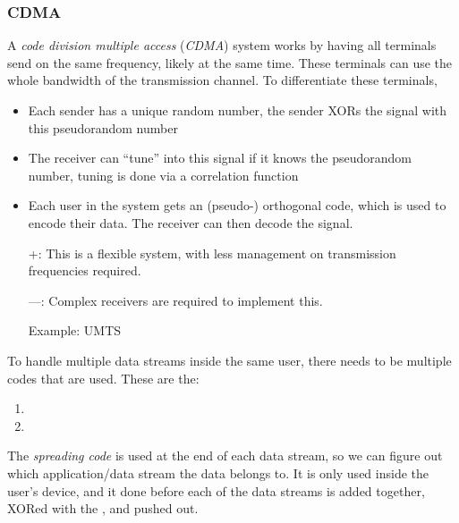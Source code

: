 \subsubsection{CDMA}\label{subsubsec:CDMA}
\begin{definition}\label{def:CDMA}
  A \emph{code division multiple access} (\emph{CDMA}) system works by having all terminals send on the same frequency, likely at the same time.
  These terminals can use the whole bandwidth of the transmission channel.
  To differentiate these terminals,
  \begin{itemize}[noitemsep]
  \item Each sender has a unique random number, the sender XORs the signal with this pseudorandom number
  \item The receiver can ``tune'' into this signal if it knows the pseudorandom number, tuning is done via a correlation function
  \end{itemize}

  \begin{itemize}[noitemsep]
  \item Each user in the system gets an (pseudo-) orthogonal code, which is used to encode their data. The receiver can then decode the signal.
  \item [+:] This is a flexible system, with less management on transmission frequencies required.
  \item [---:] Complex receivers are required to implement this.
  \item [Example:] UMTS
  \end{itemize}
\end{definition}

To handle multiple data streams inside the same user, there needs to be multiple codes that are used.
These are the:
\begin{enumerate}[noitemsep]
\item {}
\item {}
\end{enumerate}

\begin{definition}\label{def:Spreading_Code}
  The \emph{spreading code} is used at the end of each data stream, so we can figure out which application/data stream the data belongs to.
  It is only used inside the user's device, and it done before each of the data streams is added together, XORed with the , and pushed out.
\end{definition}

